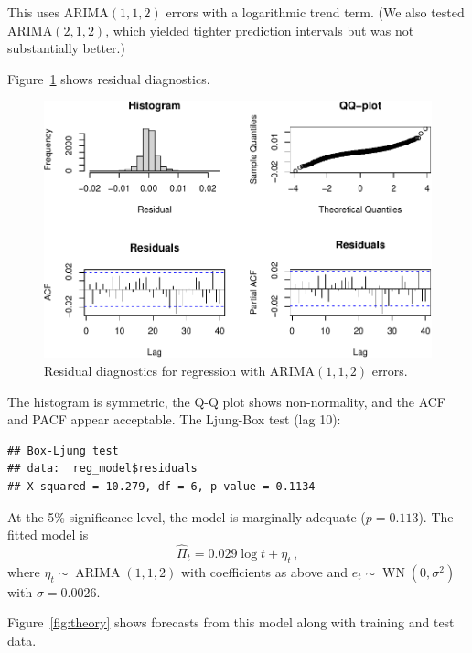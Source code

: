 \documentclass[final,11pt]{article}
\newcommand{\arima}{\operatorname{ARIMA}}
\theoremstyle{plain}
\theoremstyle{remark}
\begin{document}
This uses ARIMA$(1,1,2)$ errors with a logarithmic trend term. (We also
tested ARIMA$(2,1,2)$, which yielded tighter prediction intervals but was
not substantially better.)

Figure~\ref{fig:res} shows residual diagnostics.

\begin{figure}
\includegraphics{paper_files/figure-latex/unnamed-chunk-18-1.pdf}
\caption{Residual diagnostics for regression with ARIMA$(1,1,2)$ errors.}
\label{fig:res}
\end{figure}

The histogram is symmetric, the Q-Q plot shows non-normality, and the ACF
and PACF appear acceptable. The Ljung-Box test (lag 10):

\begin{verbatim}
## Box-Ljung test
## data:  reg_model$residuals
## X-squared = 10.279, df = 6, p-value = 0.1134
\end{verbatim}

At the 5\% significance level, the model is marginally adequate
($p = 0.113$). The fitted model is
\begin{equation}
  \hat{\Pi}_t = 0.029 \log t + \eta_t\,,
\end{equation}
where $\eta_t \sim \arima(1,1,2)$ with coefficients as above and
$e_t \sim \operatorname{WN}(0, \sigma^2)$ with $\sigma = 0.0026$.

Figure~\ref{fig:theory} shows forecasts from this model along with
training and test data.
\end{document}
